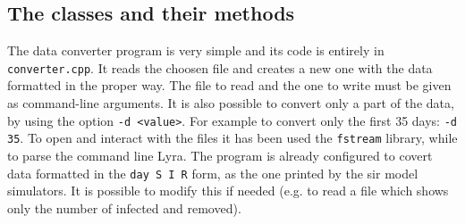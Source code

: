 \subsection{The classes and their methods}

The data converter program is very simple and its code is entirely in \verb!converter.cpp!. It reads the choosen file and creates a new one with the data formatted in the proper way. The file to read and the one to write must be given as command-line arguments. It is also possible to convert only a part of the data, by using the option  \verb!-d <value>!. For example to convert only the first 35 days: \verb!-d 35!. To open and interact with the files it has been used the \verb!fstream! library, while to parse the command line Lyra. The program is already configured to covert data formatted in the \verb!day S I R! form, as the one printed by the sir model simulators. It is possible to modify this if needed (e.g. to read a file which shows only the number of infected and removed).

